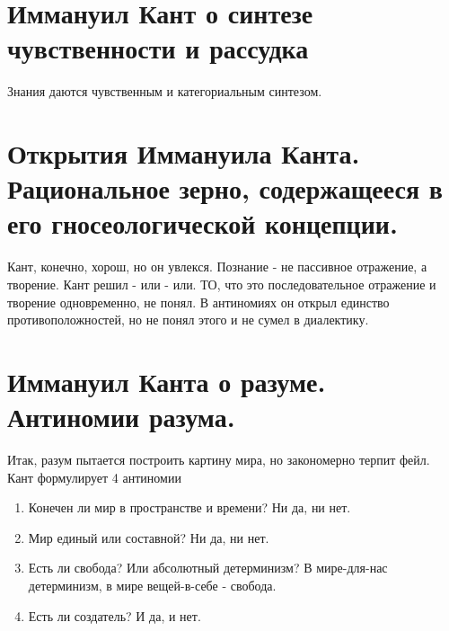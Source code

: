 \section{Иммануил Кант о синтезе чувственности и рассудка}
Знания даются чувственным и категориальным синтезом.

\section{Открытия Иммануила Канта. Рациональное зерно, содержащееся в его гносеологической концепции.}
Кант, конечно, хорош, но он увлекся. Познание - не пассивное отражение, а творение. Кант решил - или - или. ТО, что это последовательное отражение и творение одновременно, не понял.  В антиномиях он открыл единство противоположностей, но не понял этого и не сумел в диалектику.

\section{Иммануил Канта о разуме. Антиномии разума.}
Итак, разум пытается построить картину мира, но закономерно терпит фейл. Кант формулирует 4 антиномии
\begin{enumerate}
\item Конечен ли мир в пространстве и времени? Ни да, ни нет.
\item Мир единый или составной? Ни да, ни нет.
\item Есть ли свобода? Или абсолютный детерминизм? В мире-для-нас детерминизм, в мире вещей-в-себе - свобода. 
\item Есть ли создатель? И да, и нет.
\end{enumerate}

